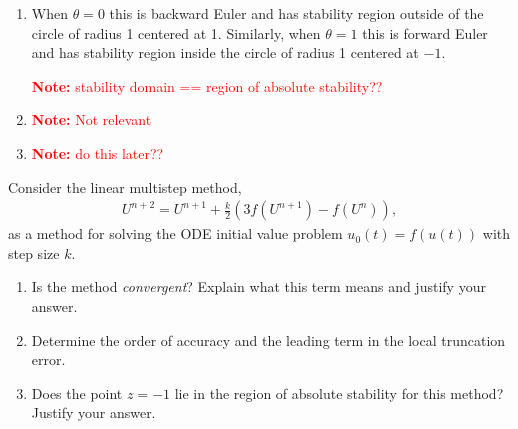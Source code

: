 \documentclass[10pt]{article}
\newcommand{\note}[1]{\textcolor{red}{\textbf{Note:} #1}}
\begin{document}
\begin{solution}[Solution]
\begin{enumerate}[label=(\alph*)]
        Then,
        \begin{align*}
            r^{n+1} \leq e^{(n+1) hL/(1+hL\theta-hL)} \leq e^{TL/(1+hL\theta - hL)} \leq e^{2TL}
        \end{align*}
        
        Therefore \( r^{n+1} \) is bounded as \( h\to 0 \).
        
        Note that,
        \begin{align*}
            \frac{sh}{r-1} = \frac{sh}{hLs} = \frac{1}{L}
        \end{align*}
        
        This means \( hs(r^{n+1}-1)/(r-1) \) is bounded, so since \( \tau \to 0 \) the method is convergent.

        Therefore for any \( \theta \) the method is convergent.


   \item When \( \theta = 0 \) this is backward Euler and has stability region outside of the circle of radius 1 centered at 1. Similarly, when \( \theta = 1 \) this is forward Euler and has stability region inside the circle of radius 1 centered at \( -1 \).
    
    \note{stability domain == region of absolute stability??} 

    \item \note{Not relevant}
    \item \note{do this later??} 
\end{enumerate} 
\end{solution}


\begin{problem}
Consider the linear multistep method,
\begin{align*}
    U^{n+2} = U^{n+1} + \frac{k}{2}(3 f(U^{n+1}) - f(U^n)),
\end{align*}
as a method for solving the ODE initial value problem \( u_0(t) = f(u(t)) \) with step size \( k \).
\begin{enumerate}[label=(\alph*),nolistsep]
\item Is the method \textit{convergent}? Explain what this term means and justify your answer.
\item Determine the order of accuracy and the leading term in the local truncation error.
\item Does the point \( z = -1 \) lie in the region of absolute stability for this method? Justify your answer.
\end{enumerate}
\end{problem}
\end{document}
